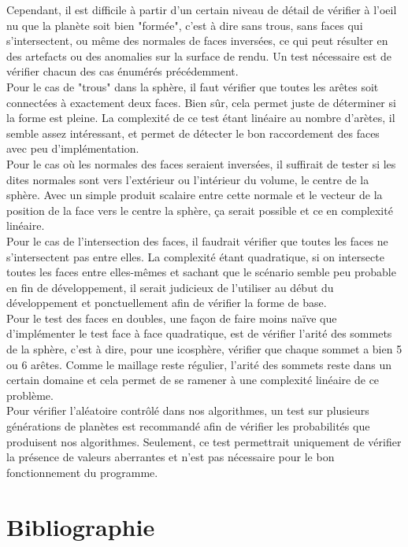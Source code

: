 \documentclass[a4paper]{article}
\begin{document}
Cependant, il est difficile à partir d'un certain niveau de détail de vérifier à l'oeil nu que la planète soit bien "formée", c'est à dire sans trous, sans faces qui s'intersectent, ou même des normales de faces inversées, ce qui peut résulter en des artefacts ou des anomalies sur la surface de rendu. Un test nécessaire est de vérifier chacun des cas énumérés précédemment.\\

Pour le cas de "trous" dans la sphère, il faut vérifier que toutes les arêtes soit connectées à exactement deux faces. Bien sûr, cela permet juste de déterminer si la forme est pleine. La complexité de ce test étant linéaire au nombre d'arètes, il semble assez intéressant, et permet de détecter le bon raccordement des faces avec peu d'implémentation.\\

Pour le cas où les normales des faces seraient inversées, il suffirait de tester si les dites normales sont vers l'extérieur ou l'intérieur du volume, le centre de la sphère. Avec un simple produit scalaire entre cette normale et le vecteur de la position de la face vers le centre la sphère, ça serait possible et ce en complexité linéaire.\\

Pour le cas de l'intersection des faces, il faudrait vérifier que toutes les faces ne s'intersectent pas entre elles. La complexité étant quadratique, si on intersecte toutes les faces entre elles-mêmes et sachant que le scénario semble peu probable en fin de développement, il serait judicieux de l'utiliser au début du développement et ponctuellement afin de vérifier la forme de base.\\

Pour le test des faces en doubles, une façon de faire moins naïve que d'implémenter le test face à face quadratique, est de vérifier l'arité des sommets de la sphère, c'est à dire, pour une icosphère, vérifier que chaque sommet a bien 5 ou 6 arêtes.
Comme le maillage reste régulier, l'arité des sommets reste dans un certain domaine et cela permet de se ramener à une complexité linéaire de ce problème. \\

Pour vérifier l'aléatoire contrôlé dans nos algorithmes, un test sur plusieurs générations de planètes est recommandé afin de vérifier les probabilités que produisent nos algorithmes. Seulement, ce test permettrait uniquement de vérifier la présence de valeurs aberrantes et n'est pas nécessaire pour le bon fonctionnement du programme.


\newpage


\section{Bibliographie}

\end{document}
